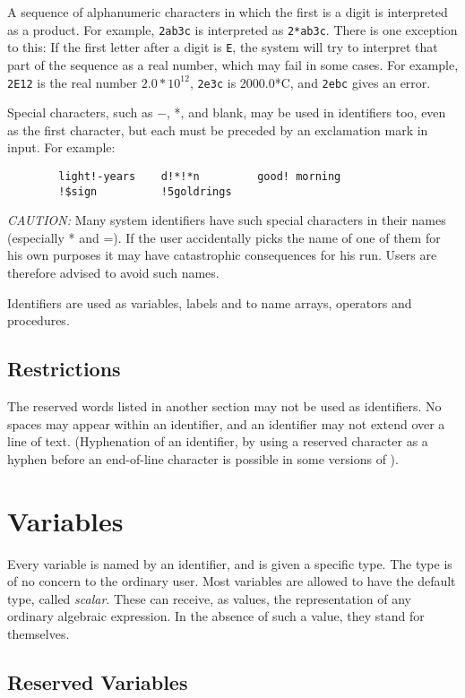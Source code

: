 A sequence of alphanumeric characters in which the first is a digit is
interpreted as a product.  For example, {\tt 2ab3c} is interpreted as
{\tt 2*ab3c}.  There is one exception to this:  If the first letter after a
digit is {\tt E}, the system will try to interpret that part of the
sequence as a real number, which may fail in some cases.  For
example, {\tt 2E12} is the real number $2.0*10^{12}$, {\tt 2e3c} is
2000.0*C, and {\tt 2ebc} gives an error.

Special characters, such as $-$, *, and blank, may be used in identifiers
too, even as the first character, but each must be preceded by an
exclamation mark in input.  For example:
\begin{verbatim}
        light!-years    d!*!*n         good! morning
        !$sign          !5goldrings
\end{verbatim}
{\it CAUTION:} Many system identifiers have such special characters in their
names (especially * and =). If the user accidentally picks the name of one
of them for his own purposes it may have catastrophic consequences for his
{\REDUCE} run.  Users are therefore advised to avoid such names.

Identifiers are used as variables, labels and to name arrays, operators
and procedures.

\subsection*{Restrictions}

The reserved words listed in another section may not be used as
identifiers.  No spaces may appear within an identifier, and an identifier
may not extend over a line of text. (Hyphenation of an identifier, by
using a reserved character as a hyphen before an end-of-line character is
possible in some versions of {\REDUCE}).

\section{Variables}

Every variable is named by an identifier, and is given a
specific type.  The type is of no concern to the ordinary user.  Most
variables are allowed to have the default type, called {\em scalar}.
These can receive, as values, the representation of any ordinary algebraic
expression.  In the absence of such a value, they stand for themselves.

\subsection*{Reserved Variables}

